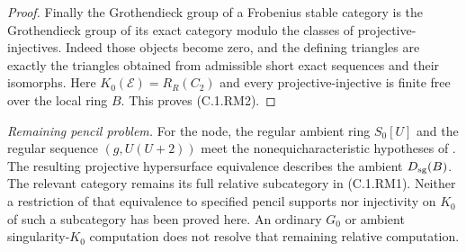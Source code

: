 \begin{proof}
Finally the Grothendieck group
of a Frobenius stable category
is the Grothendieck group of
its exact category modulo the
classes of projective-injectives.
Indeed those objects become zero,
and the defining triangles are
exactly the triangles obtained
from admissible short exact
sequences and their isomorphs.
Here $K_0(\mathcal E)=R_R(C_2)$
and every projective-injective
is finite free over the local
ring $B$.
This proves (C.1.RM2).
\end{proof}

\noindent\emph{Remaining pencil problem.}
For the node, the regular ambient
ring $S_0[U]$ and the regular
sequence $(g,U(U+2))$ meet the
nonequicharacteristic hypotheses
of \cite[Theorem 1 and Appendix A]
{C-BurkeWalker2012}.
The resulting projective
hypersurface equivalence describes
the ambient $D_{\rm sg}(B)$.
The relevant category remains
its full relative subcategory
in (C.1.RM1).
Neither a restriction of that
equivalence to specified pencil
supports nor injectivity on
$K_0$ of such a subcategory
has been proved here.
An ordinary $G_0$ or ambient
singularity-$K_0$ computation
does not resolve that remaining
relative computation.
